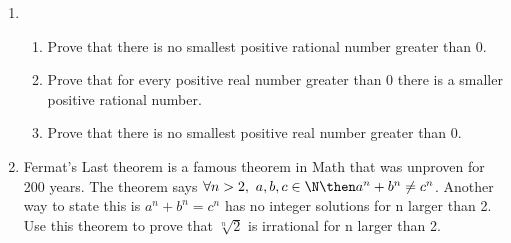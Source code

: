 \documentclass[basic, header]{nosvagor-notes}
\begin{document}
\begin{enumerate}[itemsep=5em]
  \item
    \begin{enumerate}[itemsep=4em]

      \item Prove that there is no smallest positive rational number greater
        than 0.

      \item Prove that for every positive real number greater than 0 there is a
        smaller positive rational number.

      \item Prove that there is no smallest positive real number greater than 0.

    \end{enumerate}

  \newpage %

  \item Fermat’s Last theorem is a famous theorem in Math that was unproven for
    200 years. The theorem says \(\forall n > 2,~ a,b,c \in \N \then  a^n +
    b^n \neq c^n\). Another way to state this is \(a^n + b^n = c^n\) has no integer
    solutions for n larger than 2. Use this theorem to prove that \(\sqrt[n]{2}\) is
    irrational for n larger than 2.

\end{enumerate}
\end{document}
